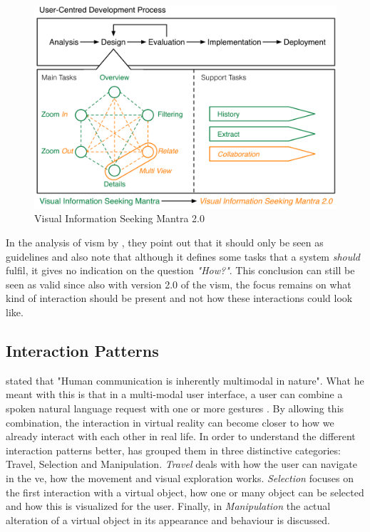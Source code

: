 \begin{figure}[h!]
	\begin{center}
		\includegraphics[width=12cm]{03_Figures/05_LitReview/Stauffer2016_VISM2.png}
		\caption[Visual Information Seeking Mantra 2.0]{Visual Information Seeking Mantra 2.0 \citep{Stauffer2016}}
		\label{fig:vism2}
	\end{center}
\end{figure}

In the analysis of \gls{vism} by \cite{Craft2005}, they point out that it should only be seen as guidelines and also note that although it defines some tasks that a system \textit{should} fulfil, it gives no indication on the question \textit{"How?"}. This conclusion can still be seen as valid since also with version 2.0 of the \gls{vism}, the focus remains on what kind of interaction should be present and not how these interactions could look like.



\subsection{Interaction Patterns}

\cite{Bunt1998} stated that "Human communication is inherently multimodal in nature". What he meant with this is that in a multi-modal user interface, a user can combine a spoken natural language request with one or more gestures \citep{Rosson2002}. By allowing this combination, the interaction in virtual reality can become closer to how we already interact with each other in real life. \newline
In order to understand the different interaction patterns better, \cite{Bowman2002} has grouped them in three distinctive categories: Travel, Selection and Manipulation. \textit{Travel} deals with how the user can navigate in the \gls{ve}, how the movement and visual exploration works. \textit{Selection} focuses on the first interaction with a virtual object, how one or many object can be selected and how this is visualized for the user. Finally, in \textit{Manipulation} the actual alteration of a virtual object in its appearance and behaviour is discussed.


